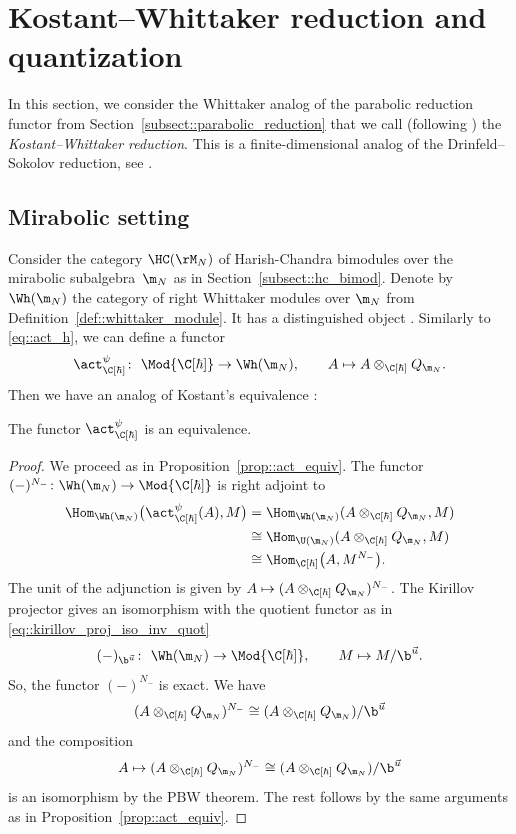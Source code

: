 	\section{Kostant--Whittaker reduction and quantization}
	\label{sect::kw_red}
	
	In this section, we consider the Whittaker analog of the parabolic reduction functor from Section~\ref{subsect::parabolic_reduction} that we call (following \cite{BezrukavnikovFinkelberg}) the \emph{Kostant--Whittaker reduction}. This is a finite-dimensional analog of the Drinfeld--Sokolov reduction, see \cite{Arakawa}.
	
	\subsection{Mirabolic setting} Consider the category $\HC(\rM_N)$ of Harish-Chandra bimodules over the mirabolic subalgebra~$\m_N$ as in Section~\ref{subsect::hc_bimod}. Denote by $\Wh(\m_N)$ the category of right Whittaker modules over $\m_N$ from Definition~\ref{def::whittaker_module}. It has a distinguished object . Similarly to \eqref{eq::act_h}, we can define a functor
	\begin{equation*}
		\act_{\C[\hbar]}^{\psi} \colon\ \Mod{\C[\hbar]} \rightarrow \Wh(\m_N), \qquad A \mapsto A \otimes_{\C[\hbar]} Q_{\m_N}.
	\end{equation*}
	Then we have an analog of Kostant's equivalence \cite{Kostant}:
	\begin{Theorem}
		\label{thm::mirabolic_skryabin}
		The functor $\act_{\C[\hbar]}^{\psi}$ is an equivalence.
		\begin{proof}
			We proceed as in Proposition~\ref{prop::act_equiv}. The functor $(-)^{N_-} \colon \Wh(\m_N) \rightarrow \Mod{\C[\hbar]}$ is right adjoint to \smash{$\act_{\C[\hbar]}^{\psi}$}
			\begin{align*}
				\Hom_{\Wh(\m_N)} \bigl(\act_{\C[\hbar]}^{\psi}(A), M\bigr) &= \Hom_{\Wh(\m_N)}(A \otimes_{\C[\hbar]} Q_{\m_N},M) \\
				&\cong \Hom_{\U(\m_N)} (A \otimes_{\C[\hbar]} Q_{\m_N},M) \\
				&\cong \Hom_{\C[\hbar]}\bigl(A,M^{N_-}\bigr).
			\end{align*}
			The unit of the adjunction is given by
$
			A \mapsto (A \otimes_{\C[\hbar]} Q_{\m_N})^{N_-}$.
			The Kirillov projector gives an isomorphism with the quotient functor as in \eqref{eq::kirillov_proj_iso_inv_quot}
			\[
			(-)_{\b^{\vec{u}}}\colon\ \Wh(\m_N) \rightarrow \Mod{\C[\hbar]}, \qquad M \mapsto M/\b^{\vec{u}}.
			\]
			So, the functor $(-)^{N_-}$ is exact. We have
			\[
			(A \otimes_{\C[\hbar]} Q_{\m_N})^{N_-} \cong (A \otimes_{\C[\hbar]} Q_{\m_N})/ \b^{\vec{u}}
			\]
			and the composition
			\[
			A \mapsto (A \otimes_{\C[\hbar]} Q_{\m_N})^{N_-} \cong (A \otimes_{\C[\hbar]} Q_{\m_N})/ \b^{\vec{u}}
			\]
			is an isomorphism by the PBW theorem. The rest follows by the same arguments as in Proposition~\ref{prop::act_equiv}.
		\end{proof}
	\end{Theorem}
	

